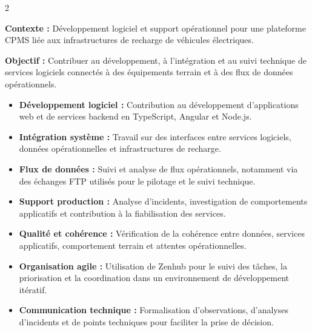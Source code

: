 \documentclass[8pt,a4paper,ragged2e,withhyper]{altacv}
\begin{document}



\makecvheader
\vspace{-0.3cm}


\begin{paracol}{2}



\textbf{Contexte :} Développement logiciel et support opérationnel pour une plateforme CPMS liée aux infrastructures de recharge de véhicules électriques.

\textbf{Objectif :} Contribuer au développement, à l'intégration et au suivi technique de services logiciels connectés à des équipements terrain et à des flux de données opérationnels.

\begin{itemize}
  \item \textbf{Développement logiciel :} Contribution au développement d'applications web et de services backend en TypeScript, Angular et Node.js.
  \item \textbf{Intégration système :} Travail sur des interfaces entre services logiciels, données opérationnelles et infrastructures de recharge.
  \item \textbf{Flux de données :} Suivi et analyse de flux opérationnels, notamment via des échanges FTP utilisés pour le pilotage et le suivi technique.
  \item \textbf{Support production :} Analyse d'incidents, investigation de comportements applicatifs et contribution à la fiabilisation des services.
  \item \textbf{Qualité et cohérence :} Vérification de la cohérence entre données, services applicatifs, comportement terrain et attentes opérationnelles.
  \item \textbf{Organisation agile :} Utilisation de Zenhub pour le suivi des tâches, la priorisation et la coordination dans un environnement de développement itératif.
  \item \textbf{Communication technique :} Formalisation d'observations, d'analyses d'incidents et de points techniques pour faciliter la prise de décision.
\end{itemize}


\end{paracol}
\end{document}
